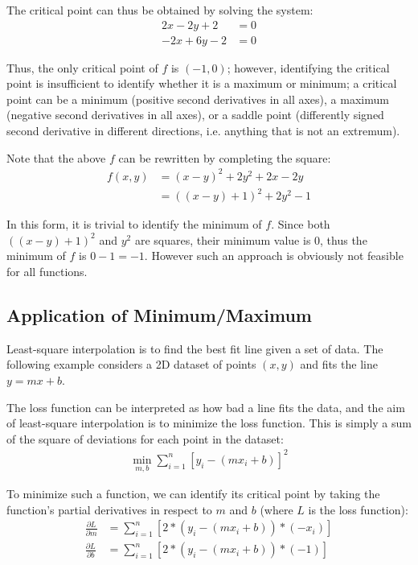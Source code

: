 \documentclass[12pt]{article}
\theoremstyle{definition}
\begin{document}
	The critical point can thus be obtained by solving the system:
	\begin{align*}
		2x - 2y + 2 &= 0 \\
		-2x + 6y - 2 &= 0
	\end{align*}
	
	Thus, the only critical point of $f$ is $(-1, 0)$; however, identifying the critical point is insufficient to identify whether it is a maximum or minimum; a critical point can be a minimum (positive second derivatives in all axes), a maximum (negative second derivatives in all axes), or a saddle point (differently signed second derivative in different directions, i.e. anything that is not an extremum).
	
	Note that the above $f$ can be rewritten by completing the square:
	\begin{align*}
		f(x, y) &= (x - y)^2 + 2y^2 + 2x - 2y \\
		&= ((x - y) + 1)^2 + 2y^2 - 1
	\end{align*}
	
	In this form, it is trivial to identify the minimum of $f$. Since both $((x - y) + 1)^2$ and $y^2$ are squares, their minimum value is $0$, thus the minimum of $f$ is $0 - 1 = -1$. However such an approach is obviously not feasible for all functions.
	
	\subsection{Application of Minimum/Maximum}
	
	Least-square interpolation is to find the best fit line given a set of data. The following example considers a 2D dataset of points $(x, y)$ and fits the line $y = mx + b$.
	
	The loss function can be interpreted as how bad a line fits the data, and the aim of least-square interpolation is to minimize the loss function. This is simply a sum of the square of deviations for each point in the dataset:
	\begin{gather*}
		\min_{m, b} \sum^n_{i=1} [y_i - (mx_i + b)]^2
	\end{gather*}
	
	To minimize such a function, we can identify its critical point by taking the function's partial derivatives in respect to $m$ and $b$ (where $L$ is the loss function):
	\begin{align*}
		\frac{\partial L}{\partial m} &= \sum^n_{i=1} [2 * (y_i - (mx_i + b)) * (-x_i)] \\
		\frac{\partial L}{\partial b} &= \sum^n_{i=1} [2 * (y_i - (mx_i + b)) * (-1)]
	\end{align*}
	
\end{document}
